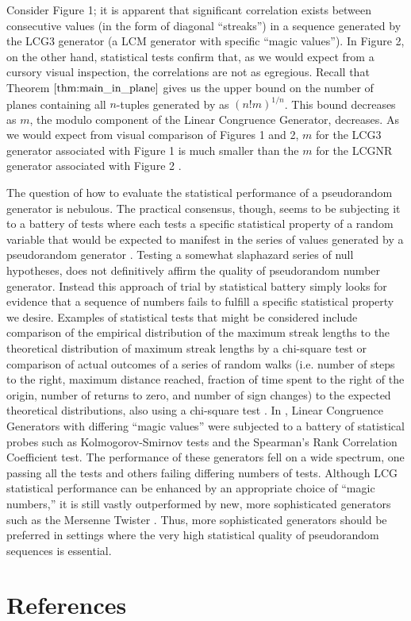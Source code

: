 \documentclass{article}
\theoremstyle{break}
\begin{document}
Consider Figure 1; it is apparent that significant correlation exists between consecutive values (in the form of diagonal ``streaks'') in a sequence generated by the LCG3 generator (a LCM generator with specific ``magic values''). In Figure 2, on the other hand, statistical tests confirm that, as we would expect from a cursory visual inspection, the correlations are not as egregious. Recall that Theorem $\ref{thm:main_in_plane}$ gives us the upper bound on the number of planes containing all $n$-tuples generated by as $(n!m)^{1/n}$. This bound decreases as $m$, the modulo component of the Linear Congruence Generator, decreases. As we would expect from visual comparison of Figures 1 and 2, $m$ for the LCG3 generator associated with Figure 1 is much smaller than the $m$ for the LCGNR generator associated with Figure 2 \autocite{burgoine_testing_2013}.

The question of how to evaluate the statistical performance of a pseudorandom generator is nebulous. The practical consensus, though, seems to be subjecting it to a battery of tests where each tests a specific statistical property of a random variable that would be expected to manifest in the series of values generated by a pseudorandom generator \autocite{lecuyer_testu01:_2007}. Testing a somewhat slaphazard series of null hypotheses, does not definitively affirm the quality of pseudorandom number generator. Instead this approach of trial by statistical battery simply looks for evidence that a sequence of numbers fails to fulfill a specific statistical property we desire. Examples of statistical tests that might be considered include comparison of the empirical distribution of the maximum streak lengths to the theoretical distribution of maximum streak lengths by a chi-square test or comparison of actual outcomes of a series of random walks (i.e. number of steps to the right, maximum distance reached, fraction of time spent to the right of the origin, number of returns to zero, and number of sign changes) to the expected theoretical distributions, also using a chi-square test \autocite{lecuyer_testu01:_2007}. In \autocite{burgoine_testing_2013}, Linear Congruence Generators with differing ``magic values'' were subjected to a battery of statistical probes such as Kolmogorov-Smirnov tests and the Spearman’s Rank Correlation Coefficient test. The performance of these generators fell on a wide spectrum, one passing all the tests and others failing differing numbers of tests. Although LCG statistical performance can be enhanced by an appropriate choice of ``magic numbers,'' it is still vastly outperformed by new, more sophisticated generators such as the Mersenne Twister \autocite{burgoine_testing_2013}. Thus, more sophisticated generators should be preferred in settings where the very high statistical quality of pseudorandom sequences is essential.  
\section{References}

\printbibliography[heading=none]
\end{document}
